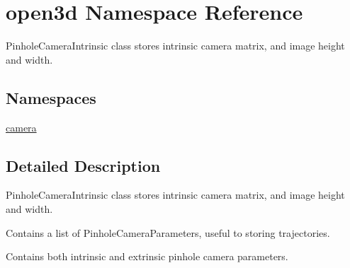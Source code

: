\hypertarget{namespaceopen3d}{}\section{open3d Namespace Reference}
\label{namespaceopen3d}


Pinhole\+Camera\+Intrinsic class stores intrinsic camera matrix, and image height and width.  


\subsection*{Namespaces}
\begin{DoxyCompactItemize}
\item 
 \mbox{\hyperlink{namespaceopen3d_1_1camera}{camera}}
\end{DoxyCompactItemize}


\subsection{Detailed Description}
Pinhole\+Camera\+Intrinsic class stores intrinsic camera matrix, and image height and width. 

Contains a list of Pinhole\+Camera\+Parameters, useful to storing trajectories.

Contains both intrinsic and extrinsic pinhole camera parameters. 